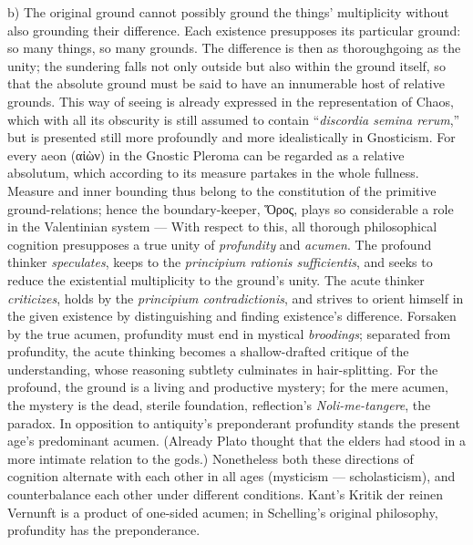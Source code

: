 \documentclass[12pt]{book}
\begin{document}
b) The original ground cannot possibly ground the things' multiplicity
without also grounding their difference. Each existence presupposes its
particular ground: so many things, so many grounds. The difference is then
as thoroughgoing as the unity; the sundering falls not only outside but also
within the ground itself, so that the absolute ground must be said to have
an innumerable host of relative grounds. This way of seeing is already
expressed in the representation of Chaos, which with all its obscurity is
still assumed to contain ``\textit{discordia semina rerum},'' but is
presented still more profoundly and more idealistically in Gnosticism. For
every aeon (αἰὼν) in the Gnostic Pleroma can be regarded as a relative
absolutum, which according to its measure partakes in the whole fullness.
Measure and inner bounding thus belong to the constitution of the primitive
ground-relations; hence the boundary-keeper, Ὅρος, plays so considerable a
role in the Valentinian system --- With respect to this, all thorough
philosophical cognition presupposes a true unity of \emph{profundity} and
\emph{acumen}. The profound thinker \emph{speculates}, keeps to the
\textit{principium rationis sufficientis}, and seeks to reduce the
existential multiplicity to the ground's unity. The acute thinker
\emph{criticizes}, holds by the \textit{principium contradictionis}, and
strives to orient himself in the given existence by distinguishing and
finding existence's difference. Forsaken by the true acumen, profundity must
end in mystical \emph{broodings}; separated from profundity, the acute
thinking becomes a shallow-drafted critique of the understanding, whose
reasoning subtlety culminates in hair-splitting. For the profound, the
ground is a living and productive mystery; for the mere acumen, the mystery
is the dead, sterile foundation, reflection's \textit{Noli-me-tangere}, the
paradox. In opposition to antiquity's preponderant profundity stands the
present age's predominant acumen. (Already Plato thought that the elders had
stood in a more intimate relation to the gods.) Nonetheless both these
directions of cognition alternate with each other in all ages (mysticism ---
scholasticism), and counterbalance each other under different conditions.
Kant's Kritik der reinen Vernunft is a product of one-sided acumen; in
Schelling's original philosophy, profundity has the preponderance.
\end{document}
